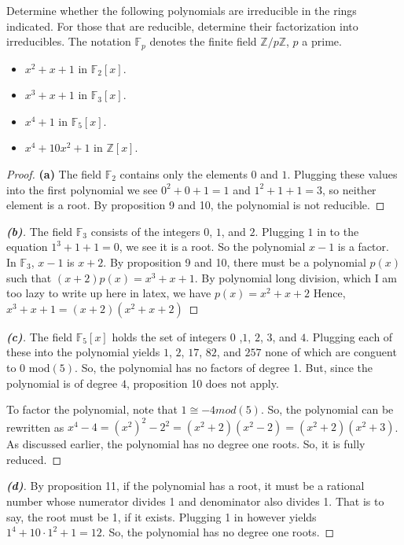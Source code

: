 \documentclass[10pt]{article}
\newenvironment{problem}[2][Problem]{\begin{trivlist}
		\item[\hskip \labelsep {\bfseries #1}\hskip \labelsep {\bfseries #2.}]}{\end{trivlist}}
\begin{document}
	\begin{problem}{4.1}
		Determine whether the following polynomials are irreducible in the rings indicated. For
		those that are reducible, determine their factorization into irreducibles. The notation $\mathbb{F}_p$
		denotes the finite field $\mathbb{Z}/p\mathbb{Z}$, $p$ a prime.
		\begin{itemize}
			\item[\textbf{(a)}] $x^2 + x + 1$ in $\mathbb{F}_2[x]$.
			\item[\textbf{(b)}] $x^3 + x + 1$ in $\mathbb{F}_3[x]$.
			\item[\textbf{(c)}] $x^4 + 1$ in $\mathbb{F}_5[x]$.
			\item[\textbf{(d)}] $x^4 + 10x^2 + 1$ in $\mathbb{Z}[x]$.
		\end{itemize}
		\begin{proof}{\textbf{(a)}}
			The field $\mathbb{F}_2$ contains only the elements $0$ and $1$. Plugging these values into the first polynomial we see $0^2 + 0 + 1 = 1$ and $1^2 + 1 + 1 = 3$, so neither element is a root. By proposition 9 and 10, the polynomial is not reducible.
		\end{proof}
		\begin{proof}[\textbf{(b)}]
			The field $\mathbb{F}_3$ consists of the integers $0$, $1$, and $2$. Plugging $1$ in to the equation $1^3 + 1 + 1 = 0$, we see it is a root. So the polynomial $x-1$ is a factor. In $\mathbb{F}_3$, $x-1$ is $x+2$. By proposition 9 and 10, there must be a polynomial $p(x)$ such that $(x+2)p(x) = x^3 + x + 1$. By polynomial long division, which I am too lazy to write up here in latex, we have $p(x) = x^2 + x + 2$ Hence, $x^3 + x + 1 = (x+2)(x^2 + x + 2)$
		\end{proof}
		\begin{proof}[\textbf{(c)}]
			The field $\mathbb{F}_5[x]$ holds the set of integers $0$ ,$1$, $2$, $3$, and $4$. Plugging each of these into the polynomial yields $1$, $2$, $17$, $82$, and $257$ none of which are conguent to $0$ mod$(5)$. So, the polynomial has no factors of degree 1. But, since the polynomial is of degree $4$, proposition 10 does not apply.
			
			To factor the polynomial, note that $1 \cong -4 mod(5)$. So, the polynomial can be rewritten as $x^4 - 4 = (x^2)^2 - 2^2 = (x^2 + 2)(x^2 - 2) = (x^2 + 2)(x^2 + 3)$. As discussed earlier, the polynomial has no degree one roots. So, it is fully reduced.
		\end{proof}
		\begin{proof}[\textbf{(d)}]
			By proposition 11, if the polynomial has a root, it must be a rational number whose numerator divides 1 and denominator also divides 1. That is to say, the root must be 1, if it exists. Plugging 1 in however yields $1^4 + 10\cdot 1^2 + 1 = 12$. So, the polynomial has no degree one roots.
			

\end{proof}
\end{problem}
\end{document}
